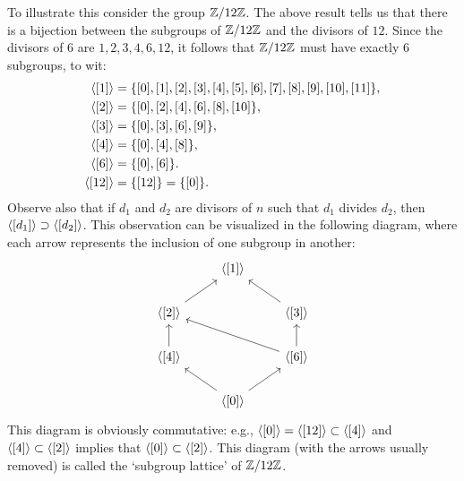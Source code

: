 \begin{example}
    To illustrate this consider the group \(\mathbb{Z}/12\mathbb{Z}\). The above result tells us
    that there is a bijection between the subgroups of \(\mathbb{Z}/12\mathbb{Z}\) and the
    divisors of \(12\). Since the divisors of \(6\) are \(1, 2, 3, 4, 6, 12\),
    it follows that \(\mathbb{Z}/12\mathbb{Z}\) must have exactly \(6\) subgroups, to wit:
    \begin{align*}
        \langle [1] \rangle & = \{[0], [1], [2], [3], [4], [5], [6], [7], [8], [9], [10], [11]\}, \\
        \langle [2] \rangle & = \{[0], [2], [4], [6], [8], [10]\}, \\
        \langle [3] \rangle & = \{[0], [3], [6], [9]\}, \\
        \langle [4] \rangle & = \{[0], [4], [8]\}, \\
        \langle [6] \rangle & = \{[0], [6]\}.\\
        \langle [12] \rangle & = \{[12]\} = \{[0]\}.
    \end{align*}
    Observe also that if \(d_1\) and \(d_2\) are divisors of \(n\) such that
    \(d_1\) divides \(d_2\), then \(\langle [d_1] \rangle \supset \langle [d_2] \rangle\). This
    observation can be visualized in the following diagram, where each arrow
    represents the inclusion of one subgroup in another:
    \[
        \begin{tikzcd}
            & \gen{[1]}                       &                                         \\
        \gen{[2]} \arrow[ru] &                                         & \gen{[3]} \arrow[lu]            \\
        \gen{[4]} \arrow[u]  &                                         & \gen{[6]} \arrow[u] \arrow[llu] \\
                & \gen{[0]} \arrow[ru] \arrow[lu] &                                        
        \end{tikzcd}
    \]
    This diagram is obviously commutative: e.g., \(\langle [0] \rangle = \langle [12] \rangle
    \subset \langle [4] \rangle\) and \(\langle [4] \rangle \subset \langle [2] \rangle\) implies that
    \(\langle [0] \rangle \subset \langle [2] \rangle\). This diagram (with the arrows usually
    removed) is called the `subgroup lattice' of \(\mathbb{Z}/12\mathbb{Z}\).
\end{example}

